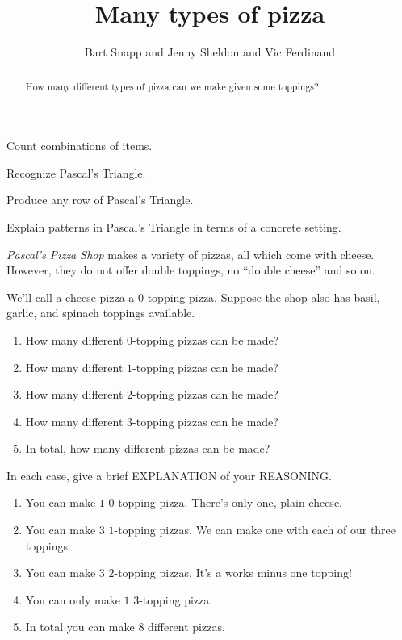 \documentclass[noauthor,nooutcomes,hints,handout]{ximera}
\author{Bart Snapp and Jenny Sheldon and Vic Ferdinand}
\title{Many types of pizza}
\begin{document}
\begin{abstract}
  How many different types of pizza can we make given some toppings?
\end{abstract}
\maketitle

\begin{listOutcomes}
\item Count combinations of items.
\item Recognize Pascal's Triangle.
\item Produce any row of Pascal's Triangle.
\item Explain patterns in Pascal's Triangle in terms of a concrete
  setting.
\end{listOutcomes}


\textit{Pascal's Pizza Shop} makes a variety of pizzas, all which come
with cheese.  However, they do not offer double
toppings, no ``double cheese'' and so on.


\mynewpage


\begin{question}
  We'll call a cheese pizza a $0$-topping pizza. Suppose the shop also
  has basil, garlic, and spinach toppings available.
\begin{enumerate}
\item How many different $0$-topping pizzas can be made?
\item How many different $1$-topping pizzas can he made?
\item How many different $2$-topping pizzas can he made?
\item How many different $3$-topping pizzas can he made?
\item In total, how many different pizzas can be made?
\end{enumerate}
In each case, give a brief EXPLANATION of your REASONING.
\begin{freeResponse}
  \begin{enumerate}
  \item You can make $1$ $0$-topping pizza. There's only one, plain
    cheese.
  \item You can make $3$ $1$-topping pizzas. We can make one with each
    of our three toppings.
  \item You can make $3$ $2$-topping pizzas. It's a works minus one topping!
  \item You can only make $1$ $3$-topping pizza.
  \item In total you can make $8$ different pizzas.
  \end{enumerate}
\end{freeResponse}
\end{question}
\mynewpage
\end{document}
